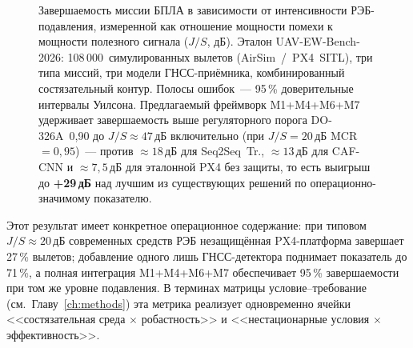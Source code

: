 \begin{figure}[!htbp]
\caption{Завершаемость миссии БПЛА в зависимости от интенсивности
РЭБ-подавления, измеренной как отношение мощности помехи к мощности
полезного сигнала ($J/S$, дБ). Эталон
\textsf{UAV-EW-Bench-2026}: 108\,000~симулированных вылетов
(AirSim~/~PX4~SITL), три типа миссий, три модели ГНСС-приёмника,
комбинированный состязательный контур. Полосы ошибок~--- 95\,\%
доверительные интервалы Уилсона. Предлагаемый фреймворк
\textsf{M1+M4+M6+M7} удерживает завершаемость выше регуляторного
порога \mbox{DO-326A}~0{,}90 до $J/S \approx 47$\,дБ включительно
(при $J/S=20$\,дБ \textsf{MCR}~$=0{,}95$)~--- против $\approx 18$\,дБ
для Seq2Seq~Tr., $\approx 13$\,дБ для CAF-CNN и $\approx 7{,}5$\,дБ
для эталонной PX4 без защиты, то есть выигрыш до \textbf{+29\,дБ} над
лучшим из существующих решений по операционно-значимому показателю.}
\label{fig:uav_mission_completion}
\end{figure}
\FloatBarrier
Этот результат имеет конкретное операционное содержание: при типовом
$J/S \approx 20$\,дБ современных средств РЭБ
\cite{wapo_excalibur_2024,inside_uas_2025} незащищённая PX4-платформа
завершает 27\,\% вылетов; добавление одного лишь ГНСС-детектора
\cite{borhani_2024_uav} поднимает показатель до 71\,\%, а полная
интеграция \textsf{M1+M4+M6+M7} обеспечивает 95\,\% завершаемости при
том же уровне подавления. В терминах матрицы условие--требование
(см.~Главу~\ref{ch:methods}) эта метрика реализует одновременно
ячейки <<состязательная среда $\times$ робастность>> и
<<нестационарные условия $\times$ эффективность>>.

